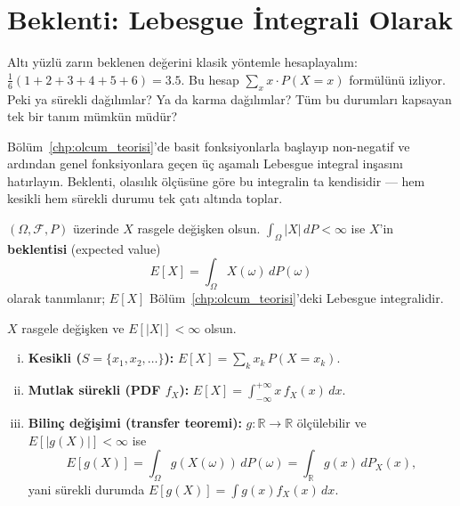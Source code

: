 \section{Beklenti: Lebesgue İntegrali Olarak}
\label{sec:beklenti_tanim}

\begin{kesif}
Altı yüzlü zarın beklenen değerini klasik yöntemle hesaplayalım:
$\frac{1}{6}(1+2+3+4+5+6) = 3.5$.
Bu hesap $\sum_x x \cdot P(X=x)$ formülünü izliyor.
Peki ya sürekli dağılımlar? Ya da karma dağılımlar?
Tüm bu durumları kapsayan tek bir tanım mümkün müdür?
\end{kesif}

\begin{tanimgerekce}
Bölüm~\ref{chp:olcum_teorisi}'de basit fonksiyonlarla başlayıp
non-negatif ve ardından genel fonksiyonlara geçen üç aşamalı Lebesgue
integral inşasını hatırlayın. Beklenti, olasılık ölçüsüne göre bu
integralin ta kendisidir --- hem kesikli hem sürekli durumu tek çatı altında toplar.
\end{tanimgerekce}

\begin{tanim}[Beklenti]
\label{def:beklenti}
$(\Omega, \mathcal{F}, P)$ üzerinde $X$ rasgele değişken olsun.
$\int_\Omega |X| \, dP < \infty$ ise $X$'in \textbf{beklentisi} (expected value)
\[
  E[X] = \int_\Omega X(\omega) \, dP(\omega)
\]
olarak tanımlanır; $E[X]$ Bölüm~\ref{chp:olcum_teorisi}'deki Lebesgue integralidir.
\end{tanim}

\begin{teorem}
\label{thm:beklenti_formul}
$X$ rasgele değişken ve $E[|X|] < \infty$ olsun.
\begin{enumerate}[(i)]
  \item \textbf{Kesikli ($S = \{x_1, x_2, \ldots\}$):}
        $E[X] = \sum_k x_k \, P(X = x_k)$.
  \item \textbf{Mutlak sürekli (PDF $f_X$):}
        $E[X] = \int_{-\infty}^{+\infty} x \, f_X(x) \, dx$.
  \item \textbf{Bilinç değişimi (transfer teoremi):}
        $g : \mathbb{R} \to \mathbb{R}$ ölçülebilir ve $E[|g(X)|] < \infty$ ise
        \[
          E[g(X)] = \int_\Omega g(X(\omega)) \, dP(\omega) = \int_{\mathbb{R}} g(x) \, dP_X(x),
        \]
        yani sürekli durumda $E[g(X)] = \int g(x) f_X(x) \, dx$.
\end{enumerate}
\end{teorem}

